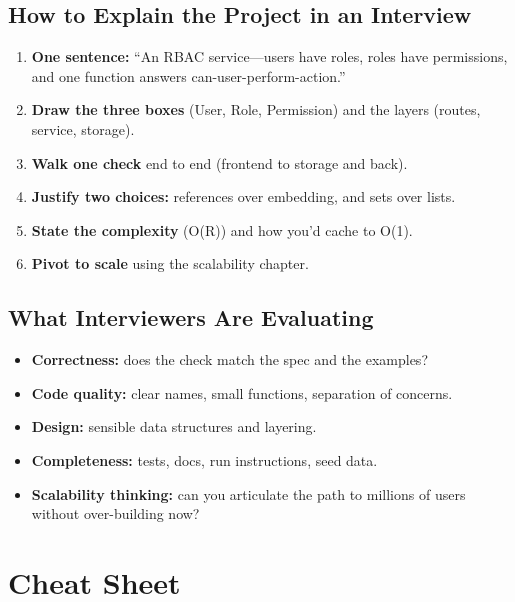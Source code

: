 \documentclass[11pt,a4paper]{report}
\begin{document}
\section{How to Explain the Project in an Interview}
\begin{enumerate}[leftmargin=1.6em]
  \item \textbf{One sentence:} ``An RBAC service---users have roles, roles have
        permissions, and one function answers can-user-perform-action.''
  \item \textbf{Draw the three boxes} (User, Role, Permission) and the layers
        (routes, service, storage).
  \item \textbf{Walk one check} end to end (frontend to storage and back).
  \item \textbf{Justify two choices:} references over embedding, and sets over
        lists.
  \item \textbf{State the complexity} (O(R)) and how you'd cache to O(1).
  \item \textbf{Pivot to scale} using the scalability chapter.
\end{enumerate}

\section{What Interviewers Are Evaluating}
\begin{itemize}[leftmargin=1.4em]
  \item \textbf{Correctness:} does the check match the spec and the examples?
  \item \textbf{Code quality:} clear names, small functions, separation of
        concerns.
  \item \textbf{Design:} sensible data structures and layering.
  \item \textbf{Completeness:} tests, docs, run instructions, seed data.
  \item \textbf{Scalability thinking:} can you articulate the path to millions of
        users without over-building now?
\end{itemize}

\chapter{Cheat Sheet}
\end{document}
